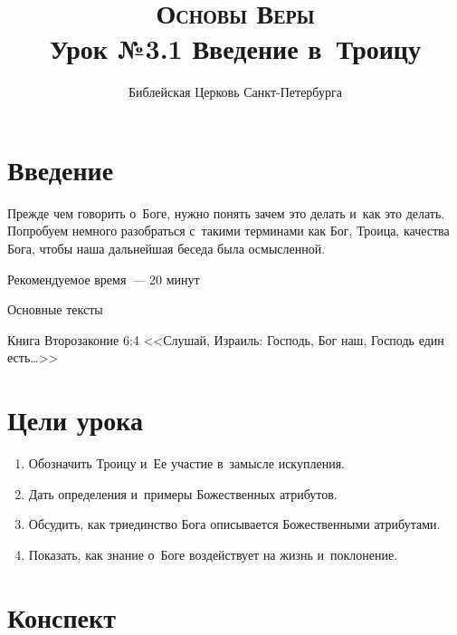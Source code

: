 \documentclass[a4paper,12pt]{article}
\title{\textsc{Основы Веры}\\Урок №3.1 Введение в~Троицу}
\author{Библейская Церковь Санкт-Петербурга}
\date{}
\begin{document}
\maketitle

\thispagestyle{empty}

    

\tableofcontents

\newcommand{\myline}{\noindent\makebox[\linewidth]{\rule{\linewidth}{0.1pt}}}


\section{Введение}
Прежде чем говорить о~Боге, нужно понять зачем это делать и~как это делать. Попробуем немного разобраться с~такими терминами как Бог, Троица, качества Бога, чтобы наша дальнейшая беседа была осмысленной.

Рекомендуемое время~--- 20 минут
        
Основные тексты

Книга Второзаконие 6:4 
<<Слушай, Израиль: Господь, Бог наш, Господь един есть\ldots>>
    

\section{Цели урока}
\begin{enumerate}
    \item Обозначить Троицу и~Ее участие в~замысле искупления.
    \item Дать определения и~примеры Божественных атрибутов.
    \item Обсудить, как триединство Бога описывается Божественными атрибутами.
    \item Показать, как знание о~Боге воздействует на жизнь и~поклонение.
\end{enumerate}

\section{Конспект}
\end{document}
